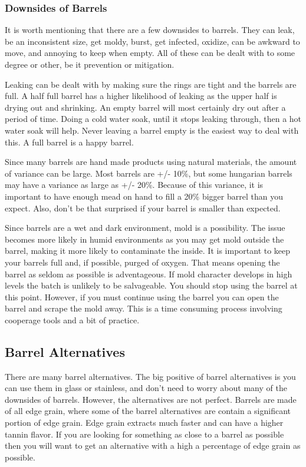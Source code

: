   \subsubsection{Downsides of Barrels}
   It is worth mentioning that there are a few downsides to barrels. They can leak, be an inconsistent size,
   get moldy, burst, get infected, oxidize, can be awkward to move, and annoying to keep when empty.
   All of these can be dealt with to some degree or other, be it prevention or mitigation.

   Leaking can be dealt with by making sure the rings are tight and the barrels are full. A half full barrel has
   a higher likelihood of leaking as the upper half is drying out and shrinking. An empty barrel will most
   certainly dry out after a period of time. Doing a cold water soak, until it stops leaking through, then 
   a hot water soak will help. Never leaving a barrel empty is the easiest way to deal with this. A full
   barrel is a happy barrel.

   Since many barrels are hand made products using natural materials, the amount of variance can be large.
   Most barrels are +/- 10\%, but some hungarian barrels may have a variance as large as +/- 20\%.
   Because of this variance, it is important to have enough mead on hand to fill a 20\% bigger barrel than you expect.
   Also, don't be that surprised if your barrel is smaller than expected.

   Since barrels are a wet and dark environment, mold is a possibility. The issue becomes more likely in humid
   environments as you may get mold outside the barrel, making it more likely to contaminate the inside.
   It is important to keep your barrels full and, if possible, purged of oxygen.
   That means opening the barrel as seldom as possible is adventageous.
   If mold character develops in high levels the batch is unlikely to be salvageable. You should stop using the barrel
   at this point. However, if you must continue using the barrel you can open the barrel and scrape the mold away.
   This is a time consuming process involving cooperage tools and a bit of practice.


 \subsection{Barrel Alternatives}
  There are many barrel alternatives. The big positive of barrel alternatives is you can use them in glass
  or stainless, and don't need to worry about many of the downsides of barrels. However, the
  alternatives are not perfect. Barrels are made of all edge grain, where some of the barrel alternatives are
  contain a significant portion of edge grain. Edge grain extracts much faster and can have a higher tannin
  flavor. If you are looking for something as close to a barrel as possible then you will want to get an
  alternative with a high a percentage of edge grain as possible.

